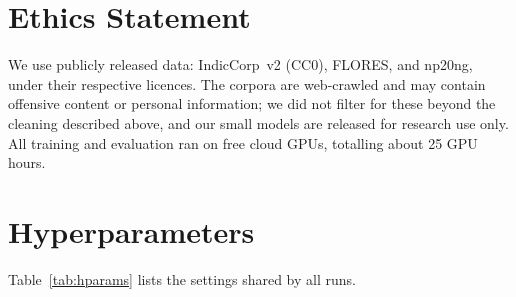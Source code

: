 \documentclass[11pt]{article}
\begin{document}
\section*{Ethics Statement}

We use publicly released data: IndicCorp~v2 (CC0), FLORES, and np20ng, under their respective licences. The corpora are web-crawled and may contain offensive content or personal information; we did not filter for these beyond the cleaning described above, and our small models are released for research use only. All training and evaluation ran on free cloud GPUs, totalling about 25 GPU hours.







\onecolumn   %
\appendix

\section{Hyperparameters}
\label{app:hparams}

Table~\ref{tab:hparams} lists the settings shared by all runs.
\end{document}
